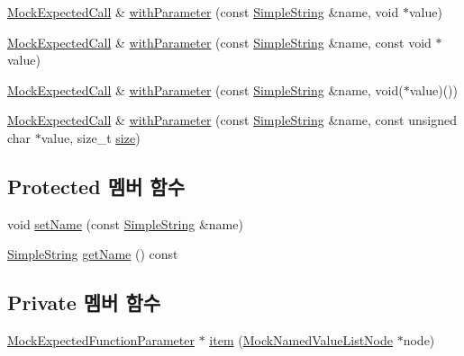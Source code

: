 \begin{DoxyCompactItemize}
\item 
\hyperlink{class_mock_expected_call}{Mock\+Expected\+Call} \& \hyperlink{class_mock_expected_call_abb0ab5ac7408454bb144beaa438030ac}{with\+Parameter} (const \hyperlink{class_simple_string}{Simple\+String} \&name, void $\ast$value)
\item 
\hyperlink{class_mock_expected_call}{Mock\+Expected\+Call} \& \hyperlink{class_mock_expected_call_a21e7495ae9bfea1385978133b6a732ec}{with\+Parameter} (const \hyperlink{class_simple_string}{Simple\+String} \&name, const void $\ast$value)
\item 
\hyperlink{class_mock_expected_call}{Mock\+Expected\+Call} \& \hyperlink{class_mock_expected_call_aba33fa78bdbe902780310feeea1be85c}{with\+Parameter} (const \hyperlink{class_simple_string}{Simple\+String} \&name, void($\ast$value)())
\item 
\hyperlink{class_mock_expected_call}{Mock\+Expected\+Call} \& \hyperlink{class_mock_expected_call_ad4aa71d2fe21ec752c8d66491038001b}{with\+Parameter} (const \hyperlink{class_simple_string}{Simple\+String} \&name, const unsigned char $\ast$value, size\+\_\+t \hyperlink{gst__avb__playbin_8c_a439227feff9d7f55384e8780cfc2eb82}{size})
\end{DoxyCompactItemize}
\subsection*{Protected 멤버 함수}
\begin{DoxyCompactItemize}
\item 
void \hyperlink{class_mock_checked_expected_call_a78091e2f29ee18ffda3ad24165e73f51}{set\+Name} (const \hyperlink{class_simple_string}{Simple\+String} \&name)
\item 
\hyperlink{class_simple_string}{Simple\+String} \hyperlink{class_mock_checked_expected_call_ab9fb89f09ab681191e4eaa9221b42491}{get\+Name} () const 
\end{DoxyCompactItemize}
\subsection*{Private 멤버 함수}
\begin{DoxyCompactItemize}
\item 
\hyperlink{class_mock_checked_expected_call_1_1_mock_expected_function_parameter}{Mock\+Expected\+Function\+Parameter} $\ast$ \hyperlink{class_mock_checked_expected_call_ae28536adf55322e7d05d9484d9b3afda}{item} (\hyperlink{class_mock_named_value_list_node}{Mock\+Named\+Value\+List\+Node} $\ast$node)
\end{DoxyCompactItemize}
